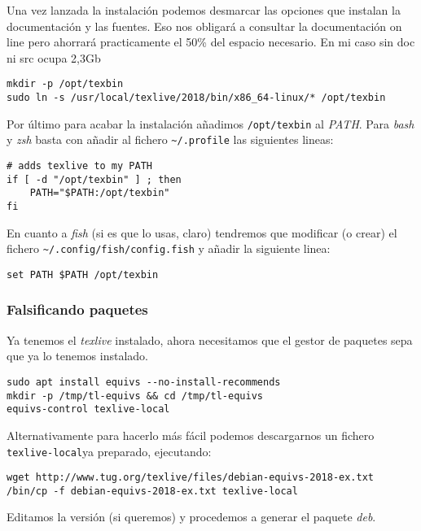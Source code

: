 \documentclass[
  12pt,
  spanish,
]{article}
\begin{document}
Una vez lanzada la instalación podemos desmarcar las opciones que
instalan la documentación y las fuentes. Eso nos obligará a consultar la
documentación on line pero ahorrará practicamente el 50\% del espacio
necesario. En mi caso sin doc ni src ocupa 2,3Gb

\begin{verbatim}
mkdir -p /opt/texbin
sudo ln -s /usr/local/texlive/2018/bin/x86_64-linux/* /opt/texbin
\end{verbatim}

Por último para acabar la instalación añadimos \texttt{/opt/texbin} al
\emph{PATH}. Para \emph{bash} y \emph{zsh} basta con añadir al fichero
\texttt{\textasciitilde{}/.profile} las siguientes lineas:

\begin{verbatim}
# adds texlive to my PATH
if [ -d "/opt/texbin" ] ; then
    PATH="$PATH:/opt/texbin"
fi
\end{verbatim}

En cuanto a \emph{fish} (si es que lo usas, claro) tendremos que
modificar (o crear) el fichero
\texttt{\textasciitilde{}/.config/fish/config.fish} y añadir la
siguiente linea:

\begin{verbatim}
set PATH $PATH /opt/texbin
\end{verbatim}

\hypertarget{falsificando-paquetes}{%
\subsubsection{Falsificando paquetes}\label{falsificando-paquetes}}

Ya tenemos el \emph{texlive} instalado, ahora necesitamos que el gestor
de paquetes sepa que ya lo tenemos instalado.

\begin{verbatim}
sudo apt install equivs --no-install-recommends
mkdir -p /tmp/tl-equivs && cd /tmp/tl-equivs
equivs-control texlive-local
\end{verbatim}

Alternativamente para hacerlo más fácil podemos descargarnos un fichero
\texttt{texlive-local}ya preparado, ejecutando:

\begin{verbatim}
wget http://www.tug.org/texlive/files/debian-equivs-2018-ex.txt
/bin/cp -f debian-equivs-2018-ex.txt texlive-local
\end{verbatim}

Editamos la versión (si queremos) y procedemos a generar el paquete
\emph{deb}.
\end{document}
